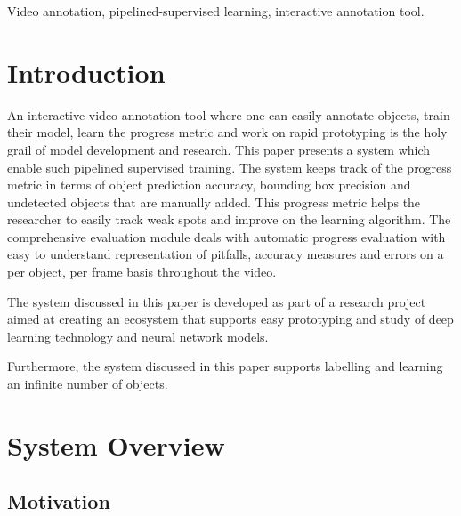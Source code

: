 \documentclass[conference]{IEEEtran}
\begin{document}
\begin{IEEEkeywords}
Video annotation, pipelined-supervised learning, interactive annotation tool.
\end{IEEEkeywords}



%
\IEEEpeerreviewmaketitle


\section{Introduction}
An interactive video annotation tool where one can easily annotate objects, train their model, learn the progress metric and work on rapid prototyping is the holy grail of model development and research. This paper presents a system which enable such pipelined supervised training. The system keeps track of the progress metric in terms of object prediction accuracy, bounding box precision and undetected objects that are manually added. This progress metric helps the researcher to easily track weak spots and improve on the learning algorithm. The comprehensive evaluation module deals with automatic progress evaluation with easy to understand representation of pitfalls, accuracy measures and errors on a per object, per frame basis throughout the video. \par
The system discussed in this paper is developed as part of a research project aimed at creating an ecosystem that supports easy prototyping and study of deep learning technology and neural network models. \par
Furthermore, the system discussed in this paper supports labelling and learning an infinite number of objects.  

\section{System Overview}\label{sec.overview}

\subsection{Motivation}
\end{document}
